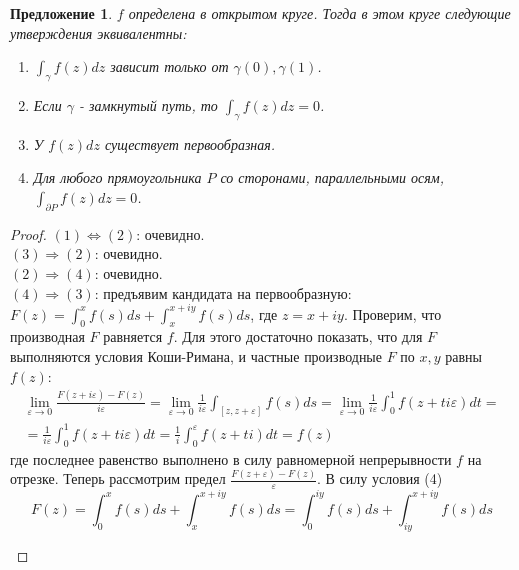 \documentclass[12pt]{article}
\newcommand{\Ra}{\Rightarrow}
\renewcommand{\iff}{\Leftrightarrow}
\newcounter{cnt}
\theoremstyle{thmnote}
\newtheorem{proposition}[cnt]{Предложение}
\theoremstyle{remark}
\theoremstyle{defnote}
\begin{document}
\begin{proposition}
\label{4eqiuv}
    $f$ определена в открытом круге. Тогда в этом круге следующие утверждения эквивалентны:
    \begin{enumerate}
        \item $\int_{\gamma} f(z)dz$ зависит только от $\gamma(0), \gamma(1)$.
        \item Если $\gamma$ - замкнутый путь, то $\int_{\gamma} f(z)dz = 0$.
        \item У $f(z)dz$ существует первообразная.
        \item Для любого прямоугольника $P$ со сторонами, параллельными осям, $\int_{\partial P} f(z)dz = 0$.
    \end{enumerate}
\end{proposition}
\begin{proof}
    $(1) \iff (2)$: очевидно. \\
    $(3) \Ra (2)$: очевидно. \\
    $(2) \Ra (4)$: очевидно. \\
    $(4) \Ra (3)$: предъявим кандидата на первообразную: $F(z) = \int_0^x f(s)ds + \int_{x}^{x+iy} f(s)ds$, где $z = x + iy$. Проверим, что производная $F$ равняется $f$. Для этого достаточно показать, что для $F$ выполняются условия Коши-Римана, и частные производные $F$ по $x, y$ равны $f(z)$:
    \begin{gather*}
        \underset{\varepsilon \to 0}{\lim} \frac{F(z + i\varepsilon) - F(z)}{i\varepsilon} = \underset{\varepsilon \to 0}{\lim} \frac{1}{i\varepsilon} \int_{[z, z + \varepsilon]} f(s)ds = \underset{\varepsilon \to 0}{\lim} \frac{1}{i\varepsilon} \int_0^1 f(z + ti\varepsilon)dt = \\
         = \frac{1}{i\varepsilon} \int_0^1 f(z + ti\varepsilon)dt = \frac{1}{i} \int_0^{\varepsilon} f(z + ti)dt = f(z)
    \end{gather*}
    где последнее равенство выполнено в силу равномерной непрерывности $f$ на отрезке. Теперь рассмотрим предел $\frac{F(z + \varepsilon) - F(z)}{\varepsilon}$. В силу условия (4)
    \begin{equation*}
        F(z) = \int_0^x f(s)ds + \int_{x}^{x+iy} f(s)ds = \int_{0}^{iy} f(s)ds + \int_{iy}^{x + iy} f(s)ds
    \end{equation*}

    \begin{center}
\end{center}
\end{proof}
\end{document}
